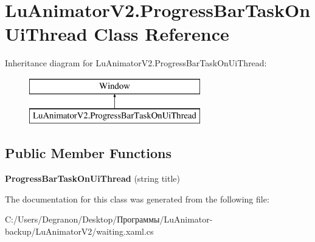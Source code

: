 \hypertarget{class_lu_animator_v2_1_1_progress_bar_task_on_ui_thread}{}\section{Lu\+Animator\+V2.\+Progress\+Bar\+Task\+On\+Ui\+Thread Class Reference}
\label{class_lu_animator_v2_1_1_progress_bar_task_on_ui_thread}
Inheritance diagram for Lu\+Animator\+V2.\+Progress\+Bar\+Task\+On\+Ui\+Thread\+:\begin{figure}[H]
\begin{center}
\leavevmode
\includegraphics[height=2.000000cm]{class_lu_animator_v2_1_1_progress_bar_task_on_ui_thread}
\end{center}
\end{figure}
\subsection*{Public Member Functions}
\begin{DoxyCompactItemize}
\item 
{\bfseries Progress\+Bar\+Task\+On\+Ui\+Thread} (string title)\hypertarget{class_lu_animator_v2_1_1_progress_bar_task_on_ui_thread_a0baff16de01e84df95e3f60cadfc4723}{}\label{class_lu_animator_v2_1_1_progress_bar_task_on_ui_thread_a0baff16de01e84df95e3f60cadfc4723}

\end{DoxyCompactItemize}


The documentation for this class was generated from the following file\+:\begin{DoxyCompactItemize}
\item 
C\+:/\+Users/\+Degranon/\+Desktop/Программы/\+Lu\+Animator-\/backup/\+Lu\+Animator\+V2/waiting.\+xaml.\+cs\end{DoxyCompactItemize}
